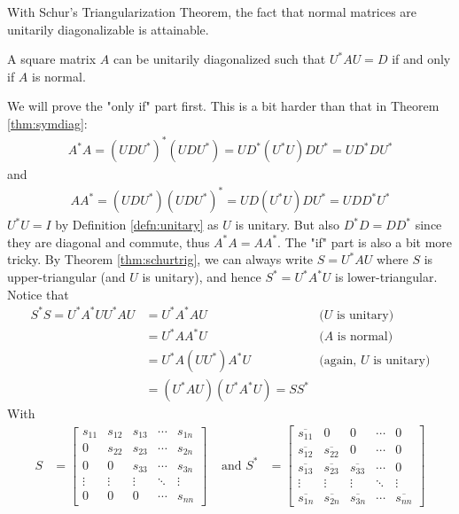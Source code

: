 With Schur's Triangularization Theorem, the fact that normal matrices are unitarily diagonalizable is attainable.
\begin{thm}
\label{thm:normalunidiag}
A square matrix $A$ can be unitarily diagonalized such that $U^*AU = D$ if and only if $A$ is normal.
\end{thm}
We will prove the "only if" part first. This is a bit harder than that in Theorem \ref{thm:symdiag}:
\begin{align*}
A^*A = (UDU^*)^*(UDU^*) = UD^*(U^*U) DU^* = UD^*DU^* 
\end{align*}
and
\begin{align*}
AA^* = (UDU^*)(UDU^*)^* = UD(U^*U) DU^* = UDD^*U^*  
\end{align*}
$U^*U = I$ by Definition \ref{defn:unitary} as $U$ is unitary. But also $D^*D = DD^*$ since they are diagonal and commute, thus $A^*A = AA^*$. The "if" part is also a bit more tricky. By Theorem \ref{thm:schurtrig}, we can always write $S = U^*AU$ where $S$ is upper-triangular (and $U$ is unitary), and hence $S^* = U^*A^*U$ is lower-triangular. Notice that
\begin{align*}
S^*S = U^*A^*U U^*AU &= U^*A^* AU &\text{($U$ is unitary)} \\
&= U^*AA^*U &\text{($A$ is normal)} \\
&= U^*A(UU^*)A^*U &\text{(again, $U$ is unitary)} \\
&= (U^*AU) (U^*A^*U) = SS^*
\end{align*}
With
\begin{align*}
S &= 
\begin{bmatrix}
s_{11} & s_{12} & s_{13} & \cdots & s_{1n} \\
0 & s_{22} & s_{23} & \cdots & s_{2n} \\
0 & 0 & s_{33} & \cdots & s_{3n} \\
\vdots & \vdots & \vdots & \ddots & \vdots \\
0 & 0 & 0 & \cdots & s_{nn}
\end{bmatrix}
& \text{ and } 
S^* &= 
\begin{bmatrix}
\overline{s_{11}} & 0 & 0 & \cdots & 0 \\
\overline{s_{12}} & \overline{s_{22}} & 0 & \cdots & 0 \\
\overline{s_{13}} & \overline{s_{23}} & \overline{s_{33}} & \cdots & 0 \\
\vdots & \vdots & \vdots & \ddots & \vdots \\
\overline{s_{1n}} & \overline{s_{2n}} & \overline{s_{3n}} & \cdots & \overline{s_{nn}}
\end{bmatrix}
\end{align*}
